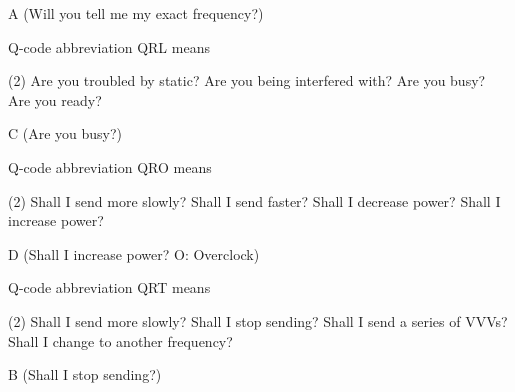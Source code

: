 \documentclass[a4paper]{article}
\begin{document}
\begin{solution}
	A (Will you tell me my exact frequency?)
\end{solution}

\vspace{5mm}



\begin{question}Q-code abbreviation \apostrophe{}QRL\apostrophe{} means
	\begin{tasks}(2)
		\task Are you troubled by static?
		\task Are you being interfered with?
		\task Are you busy?
		\task Are you ready?
	\end{tasks}
\end{question}

\begin{solution}
	C (Are you busy?)
\end{solution}

\vspace{5mm}



\begin{question}Q-code abbreviation \apostrophe{}QRO\apostrophe{} means
	\begin{tasks}(2)
		\task Shall I send more slowly?
		\task Shall I send faster?
		\task Shall I decrease power?
		\task Shall I increase power?
	\end{tasks}
\end{question}

\begin{solution}
	D (Shall I increase power? O: Overclock)
\end{solution}

\vspace{5mm}



\begin{question}Q-code abbreviation \apostrophe{}QRT\apostrophe{} means
	\begin{tasks}(2)
		\task Shall I send more slowly?
		\task Shall I stop sending?
		\task Shall I send a series of VVVs?
		\task Shall I change to another frequency?
	\end{tasks}
\end{question}

\begin{solution}
	B (Shall I stop sending?)
\end{solution}

\vspace{5mm}
\end{document}
